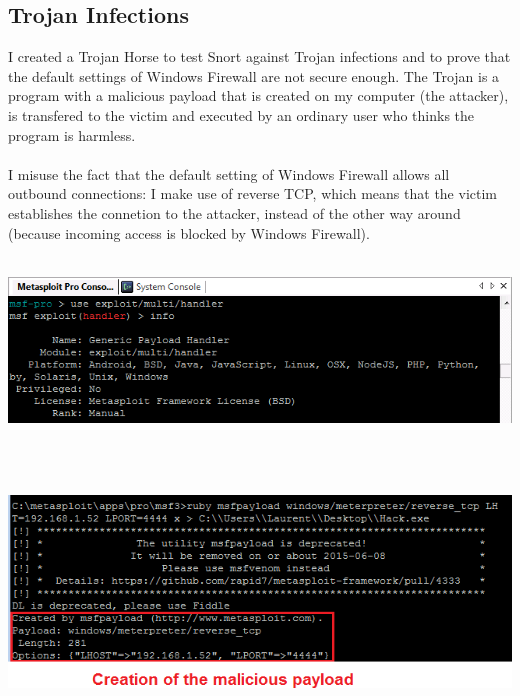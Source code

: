 \documentclass[11pt, a4paper]{article}
\begin{document}
\subsection*{Trojan Infections}

I created a Trojan Horse to test Snort against Trojan infections and to prove that the default settings of Windows Firewall are not secure enough. The Trojan is a program with a malicious payload that is created on my computer (the attacker), is transfered to the victim and executed by an ordinary user who thinks the program is harmless. \\ \\
I misuse the fact that the default setting of Windows Firewall allows all outbound connections: I make use of reverse TCP, which means that the victim establishes the connetion to the attacker, instead of the other way around (because incoming access is blocked by Windows Firewall). \\ \\
\noindent\begin{minipage}{\textwidth}
    \centering
    \includegraphics[width=\textwidth]{Trojan_1.png}
\end{minipage}
$\;$ \\ \\
\noindent\begin{minipage}{\textwidth}
    \centering
    \includegraphics[width=\textwidth]{Trojan_2.png}
\end{minipage}
\end{document}
